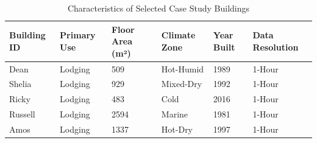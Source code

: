 \begin{table}[h]
\centering
\caption{Characteristics of Selected Case Study Buildings}
\label{tab:characteristics_of_selected_case_study_buildings}
\begin{tabular}{llllll}
\hline
Building ID & Primary Use & Floor Area (m²) & Climate Zone & Year Built & Data Resolution \\
\hline
Dean & Lodging & 509 & Hot-Humid & 1989 & 1-Hour \\
Shelia & Lodging & 929 & Mixed-Dry & 1992 & 1-Hour \\
Ricky & Lodging & 483 & Cold & 2016 & 1-Hour \\
Russell & Lodging & 2594 & Marine & 1981 & 1-Hour \\
Amos & Lodging & 1337 & Hot-Dry & 1997 & 1-Hour \\
\hline
\end{tabular}
\end{table}
